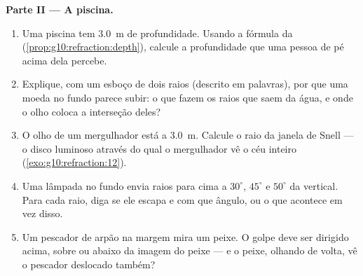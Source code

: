 \begin{problem}
\medskip
\noindent\textbf{Parte II --- A piscina.}
\begin{enumerate}[resume]
  \item Uma piscina tem \qty{3.0}{m} de profundidade. Usando a fórmula da
         (\cref{prop:g10:refraction:depth}), calcule
        a profundidade que uma pessoa de pé acima dela percebe.
  \item Explique, com um esboço de dois raios (descrito em palavras), por
        que uma moeda no fundo parece subir: o que fazem os raios que
        saem da água, e onde o olho coloca a interseção deles?
  \item O olho de um mergulhador está a \qty{3.0}{m}. Calcule o raio da
        janela de Snell --- o disco luminoso através do qual o
        mergulhador vê o céu inteiro (\cref{exo:g10:refraction:12}).
  \item Uma lâmpada no fundo envia raios para cima a $30^\circ$,
        $45^\circ$ e $50^\circ$ da vertical. Para cada raio, diga se ele
        escapa e com que ângulo, ou o que acontece em vez disso.
  \item Um pescador de arpão na margem mira um peixe. O golpe deve ser
        dirigido acima, sobre ou abaixo da imagem do peixe --- e o peixe,
        olhando de volta, vê o pescador deslocado também?
\end{enumerate}


\end{problem}
